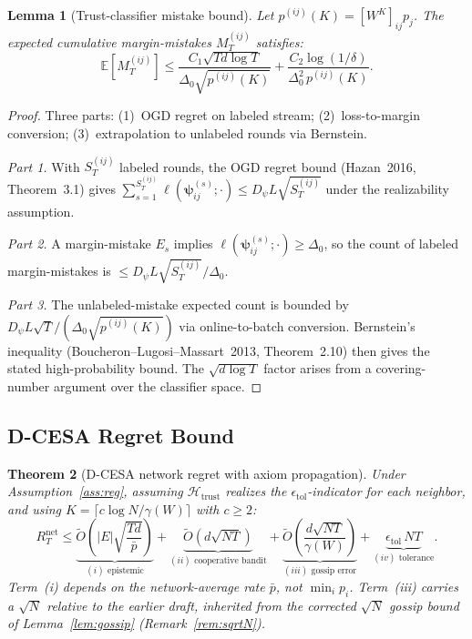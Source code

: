 \documentclass[11pt]{article}
\newtheorem{theorem}{Theorem}[section]
\newtheorem{lemma}[theorem]{Lemma}
\begin{document}
\begin{lemma}[Trust-classifier mistake bound]\label{lem:trust_mistakes}
Let $p^{(ij)}(K)=[W^K]_{ij}p_j$.  The expected cumulative
margin-mistakes $M_T^{(ij)}$ satisfies:
\[
\mathbb{E}[M_T^{(ij)}]
\leq\frac{C_1\sqrt{Td\log T}}{\Delta_0\sqrt{p^{(ij)}(K)}}
+\frac{C_2\log(1/\delta)}{\Delta_0^2\,p^{(ij)}(K)}.
\]
\end{lemma}

\begin{proof}
Three parts: (1)~OGD regret on labeled stream; (2)~loss-to-margin
conversion; (3)~extrapolation to unlabeled rounds via Bernstein.

\textit{Part 1.}  With $S_T^{(ij)}$ labeled rounds, the OGD
regret bound (Hazan~2016, Theorem~3.1) gives
$\sum_{s=1}^{S_T^{(ij)}}\ell(\bm{\psi}_{ij}^{(s)};\cdot)
\leq D_\psi L\sqrt{S_T^{(ij)}}$
under the realizability assumption.

\textit{Part 2.}  A margin-mistake $E_s$ implies
$\ell(\bm{\psi}_{ij}^{(s)};\cdot)\geq\Delta_0$, so the count of
labeled margin-mistakes is $\leq D_\psi L\sqrt{S_T^{(ij)}}/\Delta_0$.

\textit{Part 3.}  The unlabeled-mistake expected count is bounded by
$D_\psi L\sqrt{T}/(\Delta_0\sqrt{p^{(ij)}(K)})$ via online-to-batch
conversion.  Bernstein's inequality (Boucheron--Lugosi--Massart~2013,
Theorem~2.10) then gives the stated high-probability bound.
The $\sqrt{d\log T}$ factor arises from a covering-number
argument over the classifier space.
\end{proof}

\subsection{D-CESA Regret Bound}\label{sec:dcesa_regret}

\begin{theorem}[D-CESA network regret with axiom propagation]
\label{thm:dcesa}
Under Assumption~\ref{ass:reg}, assuming $\mathcal{H}_{\mathrm{trust}}$
realizes the $\epsilon_{\mathrm{tol}}$-indicator for each neighbor,
and using $K=\lceil c\log N/\gamma(W)\rceil$ with $c\geq 2$:
\begin{equation}
R_T^{\mathrm{net}}\leq
\underbrace{\widetilde{O}\!\left(|E|\sqrt{\frac{Td}{\bar{p}}}\right)}_{(i)\text{ epistemic}}
+\underbrace{\widetilde{O}\!\left(d\sqrt{NT}\right)}_{(ii)\text{ cooperative bandit}}
+\underbrace{\widetilde{O}\!\left(\frac{d\sqrt{NT}}{\gamma(W)}\right)}_{(iii)\text{ gossip error}}
+\underbrace{\epsilon_{\mathrm{tol}}\,NT}_{(iv)\text{ tolerance}}.
\label{eq:dcesa}
\end{equation}
Term~(i) depends on the network-average rate $\bar{p}$, not $\min_i p_i$.
Term~(iii) carries a $\sqrt N$ relative to the earlier draft, inherited
from the corrected $\sqrt N$ gossip bound of Lemma~\ref{lem:gossip}
(Remark~\ref{rem:sqrtN}).
\end{theorem}
\end{document}
